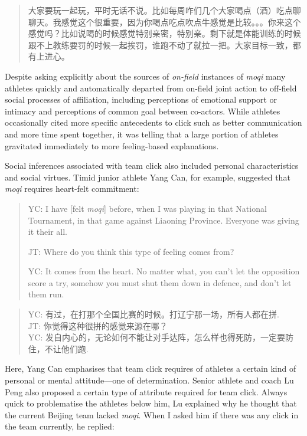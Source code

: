 \begin{CJK}{UTF8}{gbsn}
      \begin{quote}
        大家要玩一起玩，平时无话不说。比如每周咋们几个大家喝点（酒）吃点聊聊天。我感觉这个很重要，因为你喝点吃点吹点牛感觉是比较。。。你来这个感觉吗？比如说喝的时候感觉特别亲密，特别亲。剩下就是体能训练的时候跟不上教练要罚的时候一起挨罚，谁跑不动了就拉一把。大家目标一致，都有上进心。
      \end{quote}

Despite asking explicitly about the sources of \textit{on-field} instances of \textit{moqi} many athletes quickly and automatically departed from on-field joint action to off-field social processes of affiliation, including perceptions of emotional support or intimacy and perceptions of common goal between co-actors. While athletes occasionally cited more specific antecedents to click such as better communication and more time spent together, it was telling that a large portion of athletes gravitated immediately to more feeling-based explanations.

Social inferences associated with team click also included personal characteristics and social virtues.  Timid junior athlete Yang Can, for example, suggested that \textit{moqi} requires heart-felt commitment:

    \begin{quote}
      YC: I have [felt \textit{moqi}] before, when I was playing in that National Tournament, in that game against Liaoning Province.  Everyone was giving it their all.

      JT: Where do you think this type of feeling comes from?

      YC: It comes from the heart. No matter what, you can’t let the opposition score a try, somehow you must shut them down in defence, and don’t let them run.
    \end{quote}

    \begin{quote}
      YC: 有过，在打那个全国比赛的时候。打辽宁那一场，所有人都在拼.\\
      JT: 你觉得这种很拼的感觉来源在哪？\\
      YC: 发自内心的，无论如何不能让对手达阵，怎么样也得死防，一定要防住，不让他们跑.
    \end{quote}

Here, Yang Can emphasises that team click requires of athletes a certain kind of personal or mental attitude---one of determination.   Senior athlete and coach Lu Peng also proposed a certain type of attribute required for team click.  Always quick to problematise the athletes below him, Lu explained why he thought that the current Beijing team lacked \textit{moqi}.  When I asked him if there was any click in the team currently, he replied:


\end{CJK}
